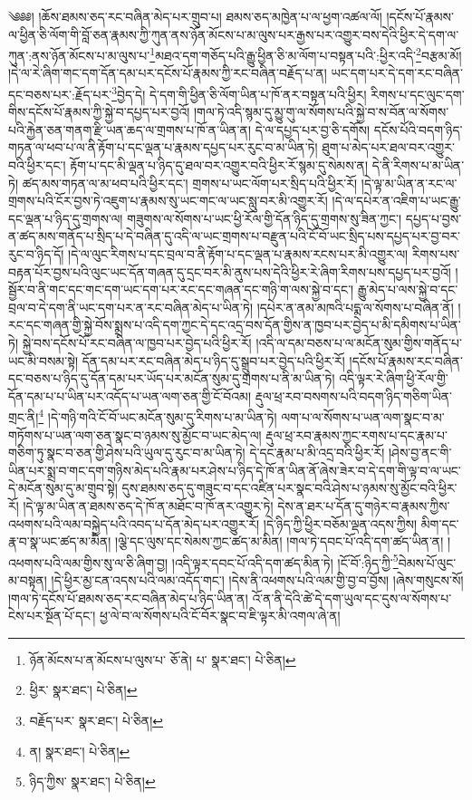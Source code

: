 \setcounter{footnote}{0} 
 ༄༅༅། །ཆོས་ཐམས་ཅད་རང་བཞིན་མེད་པར་གྲུབ་པ། ཐམས་ཅད་མཁྱེན་པ་ལ་ཕྱག་འཚལ་ལོ། །དངོས་པོ་རྣམས་ལ་ཕྱིན་ཅི་ལོག་གི་བློ་ཅན་རྣམས་ཀྱི་ཀུན་ནས་ཉོན་མོངས་པ་མ་ལུས་པར་རྒྱས་པར་འགྱུར་བས་དེའི་ཕྱིར་དེ་དག་ལ་ཀུན་:ནས་ཉོན་མོངས་པ་མ་ལུས་པ་\footnote{ཉོན་མོངས་པ་ན་མོངས་པ་ལུས་པ་  ཅོ་ནེ། པ་  སྣར་ཐང་།  པེ་ཅིན། }མཐའ་དག་གཅོད་པའི་རྒྱུ་ཕྱིན་ཅི་མ་ལོག་པ་བསྟན་པའི་:ཕྱིར་འདི་\footnote{ཕྱིར་  སྣར་ཐང་།  པེ་ཅིན། }བརྩམ་མོ། །དེ་ལ་རེ་ཞིག་གང་དག་དོན་དམ་པར་དངོས་པོ་རྣམས་ཀྱི་རང་བཞིན་བརྗོད་པ་ན། ཡང་དག་པར་དེ་དག་རང་བཞིན་དང་བཅས་པར་:རྗོད་པར་\footnote{བརྗོད་པར་  སྣར་ཐང་།  པེ་ཅིན། }བྱེད་དེ། དེ་དག་གི་ཕྱིན་ཅི་ལོག་ཡིན་པ་ཁོ་ནར་བསྟན་པའི་ཕྱིར། རིགས་པ་དང་ལུང་དག་གིས་དངོས་པོ་རྣམས་ཀྱི་སྐྱེ་བ་དཔྱད་པར་བྱའོ། །གལ་ཏེ་འདི་སྙམ་དུ་མྱུ་གུ་ལ་སོགས་པའི་སྐྱེ་བ་ས་བོན་ལ་སོགས་པའི་རྐྱེན་ཅན་གནག་རྫི་ཡན་ཆད་ལ་གྲགས་པ་ཁོ་ན་ཡིན་ན། དེ་ལ་དཔྱད་པར་བྱ་ཅི་དགོས། དངོས་པོའི་བདག་ཉིད་གཏན་ལ་ཕབ་པ་ལ་ནི་རྟོག་པ་དང་ལྡན་པ་རྣམས་དཔྱད་པར་རུང་བ་མ་ཡིན་ཏེ། ཐུག་པ་མེད་པར་ཐལ་བར་འགྱུར་བའི་ཕྱིར་དང་། རྟོག་པ་དང་མི་ལྡན་པ་ཉིད་དུ་ཐལ་བར་འགྱུར་བའི་ཕྱིར་རོ་སྙམ་དུ་སེམས་ན། དེ་ནི་རིགས་པ་མ་ཡིན་ཏེ། ཚད་མས་གཏན་ལ་མ་ཕབ་པའི་ཕྱིར་དང་། གྲགས་པ་ཡང་ལོག་པར་སྲིད་པའི་ཕྱིར་རོ། །དེ་ལྟ་མ་ཡིན་ན་རང་ལ་གྲགས་པའི་ངོར་བྱས་ཏེ་འཇུག་པ་རྣམས་སུ་ཡང་གང་ལ་ཡང་སླུ་བར་མི་འགྱུར་རོ། །དེ་ལ་དཔེར་ན་འཇིག་པ་ཡང་རྒྱུ་དང་ལྡན་པ་ཉིད་དུ་གྲགས་ལ། གཟུགས་ལ་སོགས་པ་ཡང་ཕྱི་རོལ་གྱི་དོན་ཉིད་དུ་གྲགས་སུ་ཟིན་ཀྱང་། དཔྱད་པ་བྱས་ན་ཚད་མས་གནོད་པ་སྲིད་པ་དེ་བཞིན་དུ་འདི་ལ་ཡང་གྲགས་པ་བརྫུན་པའི་ངོ་བོ་ཡང་སྲིད་པས་དཔྱད་པར་བྱ་བར་རུང་བ་ཉིད་དོ། །དེ་ལ་ལུང་རིགས་པ་དང་བྲལ་བ་ནི་རྟོག་པ་དང་ལྡན་པ་རྣམས་རངས་པར་མི་འགྱུར་ལ། རིགས་པས་བརྟན་པོར་བྱས་པའི་ལུང་ཡང་དོན་གཞན་དུ་དྲང་བར་མི་ནུས་པས་དེའི་ཕྱིར་རེ་ཞིག་རིགས་པས་དཔྱད་པར་བྱའོ། །སྦྱོར་བ་ནི་གང་དང་གང་དག་ཡང་དག་པར་རང་དང་གཞན་དང་གཉི་ག་ལས་སྐྱེ་བ་དང་། རྒྱུ་མེད་པ་ལས་སྐྱེ་བ་དང་བྲལ་བ་དེ་དག་ནི་ཡང་དག་པར་ན་རང་བཞིན་མེད་པ་ཡིན་ཏེ། །དཔེར་ན་ནམ་མཁའི་པདྨ་ལ་སོགས་པ་བཞིན་ནོ། །རང་དང་གཞན་གྱི་སྐྱེ་བོས་སྨྲས་པ་འདི་དག་ཀྱང་དེ་དང་འདྲ་བས་དོན་གྱིས་ན་ཁྱབ་པར་བྱེད་པ་མི་དམིགས་པ་ཡིན་ཏེ། སྐྱེ་བས་དངོས་པོ་རང་བཞིན་ལ་ཁྱབ་པར་བྱེད་པའི་ཕྱིར་རོ། །འདི་ལ་དམ་བཅས་པ་ལ་མངོན་སུམ་གྱིས་གནོད་པ་ཡང་མི་བསམ་སྟེ། དོན་དམ་པར་རང་བཞིན་མེད་པ་ཉིད་དུ་སྒྲུབ་པར་བྱེད་པའི་ཕྱིར་རོ། །དངོས་པོ་རྣམས་རང་བཞིན་དང་བཅས་པ་ཉིད་དུ་དོན་དམ་པར་ཡོད་པར་མངོན་སུམ་དུ་གྲགས་པ་ནི་མ་ཡིན་ཏེ། འདི་ལྟར་རེ་ཞིག་ཕྱི་རོལ་གྱི་དོན་དམ་པ་པ་ཡིན་པར་འདོད་པ་ཡན་ལག་ཅན་གྱི་ངོ་བོའམ། རྡུལ་ཕྲ་རབ་བསགས་པའི་བདག་ཉིད་གཅིག་ཡིན་གྲང་ནི།\footnote{ན།  སྣར་ཐང་།  པེ་ཅིན། } །དེ་གཉི་གའི་ངོ་བོ་ཡང་མངོན་སུམ་དུ་རིགས་པ་མ་ཡིན་ཏེ། ལག་པ་ལ་སོགས་པ་ཡན་ལག་སྣང་བ་མ་གཏོགས་པ་ཡན་ལག་ཅན་སྣང་བ་ཉམས་སུ་མྱོང་བ་ཡང་མེད་ལ། རྡུལ་ཕྲ་རབ་རྣམས་ཀྱང་རགས་པ་དང་རྣམ་པ་གཅིག་ཏུ་སྣང་བ་ཅན་གྱི་ཤེས་པའི་ཡུལ་དུ་རུང་བ་མ་ཡིན་ཏེ། དེ་དང་རྣམ་པ་མི་འདྲ་བའི་ཕྱིར་རོ། །ཤེས་བྱ་ནང་གི་ཡིན་པར་སྨྲ་བ་གང་དག་གཉིས་མེད་པའི་རྣམ་པར་ཤེས་པ་ཉིད་དེ་ཁོ་ན་ཡིན་ནོ་ཞེས་ཟེར་བ་དེ་དག་གི་ལྟ་བ་ལ་ཡང་དེ་མངོན་སུམ་དུ་མ་གྲུབ་སྟེ། དུས་ཐམས་ཅད་དུ་གཟུང་བ་དང་འཛིན་པར་སྣང་བའི་ཤེས་པ་ཉམས་སུ་མྱོང་བའི་ཕྱིར་རོ། །དེ་ལྟ་མ་ཡིན་ན་ཐམས་ཅད་དེ་ཁོ་ན་མཐོང་བ་ཁོ་ནར་འགྱུར་ཏེ། དེས་ན་ཐར་པ་དོན་དུ་གཉེར་བ་རྣམས་ཀྱིས་འཕགས་པའི་ལམ་བསྐྱེད་པའི་འབད་པ་དོན་མེད་པར་འགྱུར་རོ། །དེ་ཉིད་ཀྱི་ཕྱིར་བཅོམ་ལྡན་འདས་ཀྱིས། མིག་དང་རྣ་བ་སྣ་ཡང་ཚད་མ་མིན། །ལྕེ་དང་ལུས་དང་སེམས་ཀྱང་ཚད་མ་མིན། །གལ་ཏེ་དབང་པོ་འདི་དག་ཚད་ཡིན་ན། །འཕགས་པའི་ལམ་གྱིས་སུ་ལ་ཅི་ཞིག་བྱ། །འདི་ལྟར་དབང་པོ་འདི་དག་ཚད་མིན་ཏེ། །ངོ་བོ་:ཉིད་ཀྱི་\footnote{ཉིད་ཀྱིས་  སྣར་ཐང་།  པེ་ཅིན། }བེམས་པོ་ལུང་མ་བསྟན། །དེ་ཕྱིར་མྱ་ངན་འདས་པའི་ལམ་འདོད་གང་། །དེས་ནི་འཕགས་པའི་ལམ་གྱི་བྱ་བ་བྱོས། །ཞེས་གསུངས་སོ། །གལ་ཏེ་དངོས་པོ་ཐམས་ཅད་རང་བཞིན་མེད་པ་ཉིད་ཡིན་ན། འོ་ན་ནི་དེའི་ཚེ་དེ་དག་ཡུལ་དང་དུས་ལ་སོགས་པ་ངེས་པར་སྔོན་པོ་དང་། ཕྱ་ལེ་བ་ལ་སོགས་པའི་ངོ་བོར་སྣང་བ་ཇི་ལྟར་མི་འགལ་ཞེ་ན། 